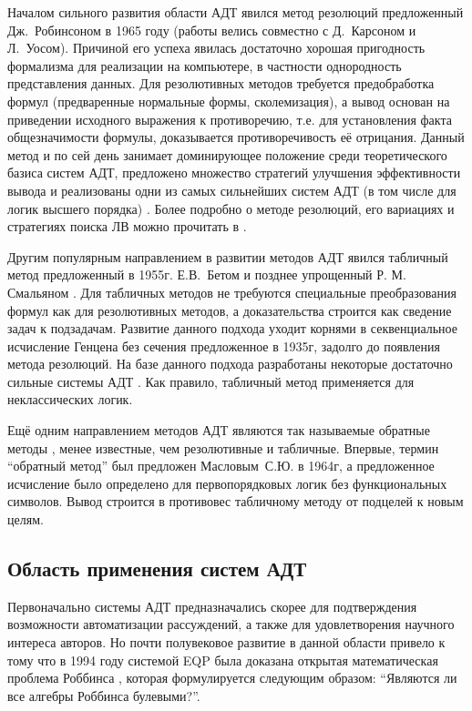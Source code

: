 Началом сильного развития области АДТ явился метод резолюций \cite{Robinson_1965} предложенный Дж.~Робинсоном в 1965 году (работы велись совместно с Д.~Карсоном и Л.~Уосом). Причиной его успеха явилась достаточно хорошая пригодность формализма для реализации на компьютере, в частности однородность представления данных. Для резолютивных методов требуется предобработка формул (предваренные нормальные формы, сколемизация), а вывод основан на приведении исходного выражения к противоречию, т.е. для установления факта общезначимости формулы, доказывается противоречивость её отрицания. Данный метод и по сей день занимает доминирующее положение среди теоретического базиса систем АДТ, предложено множество стратегий улучшения эффективности вывода и реализованы одни из самых сильнейших систем АДТ (в том числе для логик высшего порядка) \cite{otter, vprover, eprover, iprover, leoprover}. Более подробно о методе резолюций, его вариациях и стратегиях поиска ЛВ можно прочитать в \cite{HAR, ChenLi}.

Другим популярным направлением в развитии методов АДТ явился табличный метод \cite{tableau2} предложенный в 1955г. Е.В.~Бетом \cite{Beth1955} и позднее упрощенный Р. М. Смальяном \cite{Smullyan1995}. Для табличных методов не требуются специальные преобразования формул как для резолютивных методов, а доказательства строится как сведение задач к подзадачам.  Развитие данного подхода уходит корнями в секвенциальное исчисление Генцена без сечения \cite{gentzen1935} предложенное в 1935г, задолго до появления метода резолюций. На базе данного подхода разработаны некоторые достаточно сильные системы АДТ \cite{Isabelle, leancop}. Как правило, табличный метод применяется для неклассических логик.

Ещё одним направлением методов АДТ являются так называемые обратные методы \cite{inverse}, менее известные, чем резолютивные и табличные. Впервые, термин ``обратный метод'' был предложен Масловым~С.Ю. \cite{Maslov_1964} в 1964г, а предложенное исчисление было определено для первопорядковых логик без функциональных символов. Вывод строится в противовес табличному методу от подцелей к новым целям. 


\subsection{Область применения систем АДТ}
Первоначально системы АДТ предназначались скорее для подтверждения возможности автоматизации рассуждений, а также для удовлетворения научного интереса авторов. Но почти полувековое развитие в данной области привело к тому что в 1994 году системой EQP была доказана открытая математическая проблема Роббинса \cite{McCuneRob}, которая формулируется следующим образом: ``Являются ли все алгебры Роббинса булевыми?''.

